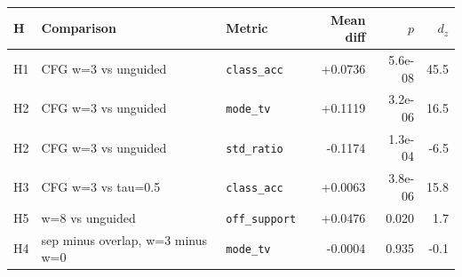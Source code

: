 \begin{tabular}{lllrrr}\toprule H & Comparison & Metric & Mean diff & $p$ & $d_z$ \\\midrule
H1 & CFG w=3 vs unguided & \texttt{class\_acc} & +0.0736 & 5.6e-08 & 45.5 \\
H2 & CFG w=3 vs unguided & \texttt{mode\_tv} & +0.1119 & 3.2e-06 & 16.5 \\
H2 & CFG w=3 vs unguided & \texttt{std\_ratio} & -0.1174 & 1.3e-04 & -6.5 \\
H3 & CFG w=3 vs tau=0.5 & \texttt{class\_acc} & +0.0063 & 3.8e-06 & 15.8 \\
H5 & w=8 vs unguided & \texttt{off\_support} & +0.0476 & 0.020 & 1.7 \\
H4 & sep minus overlap, w=3 minus w=0 & \texttt{mode\_tv} & -0.0004 & 0.935 & -0.1 \\
\bottomrule\end{tabular}
